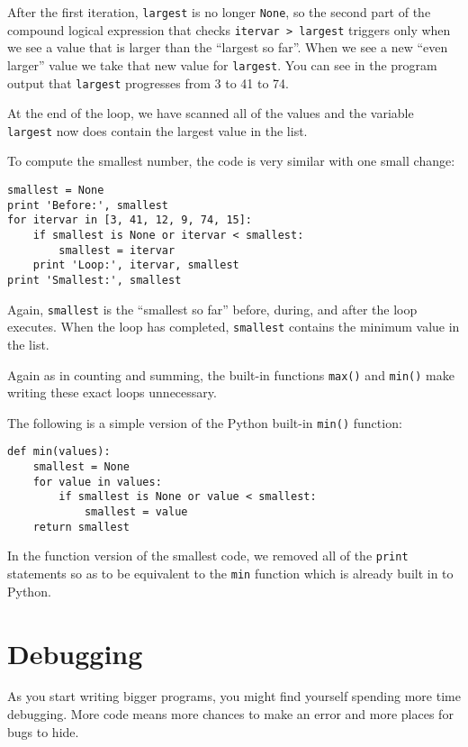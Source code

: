 After the first iteration, {\tt largest} is no longer {\tt None},
so the second part of the compound logical expression that checks
{\tt itervar > largest} triggers only when we see a value that is
larger than the ``largest so far''.  When we see a new ``even larger''
value we take that new value for {\tt largest}.  You can see in the 
program output that {\tt largest} progresses from 3 to 41 to 74.

At the end of the loop, we have scanned all of the values and
the variable {\tt largest} now does contain the largest value
in the list.

To compute the smallest number, the code is very similar with one
small change:

\beforeverb
\begin{verbatim}
smallest = None
print 'Before:', smallest
for itervar in [3, 41, 12, 9, 74, 15]:
    if smallest is None or itervar < smallest:
        smallest = itervar
    print 'Loop:', itervar, smallest
print 'Smallest:', smallest
\end{verbatim}
\afterverb
%
Again, {\tt smallest} is the ``smallest so far'' before, during, and after the 
loop executes.  When the loop has completed, {\tt smallest} contains the
minimum value in the list.

Again as in counting and summing, the built-in functions 
{\tt max()} and {\tt min()} make writing these exact loops
unnecessary.

The following is a simple version of the Python built-in
{\tt min()} function:

\beforeverb
\begin{verbatim}
def min(values):
    smallest = None
    for value in values:
        if smallest is None or value < smallest:
            smallest = value
    return smallest
\end{verbatim}
\afterverb
%
In the function version of the smallest code, we removed all of the 
{\tt print} statements so as to be equivalent to the {\tt min} 
function which is already built in to Python.

\section{Debugging}

As you start writing bigger programs, you might find yourself
spending more time debugging.  More code means more chances to
make an error and more places for bugs to hide.


